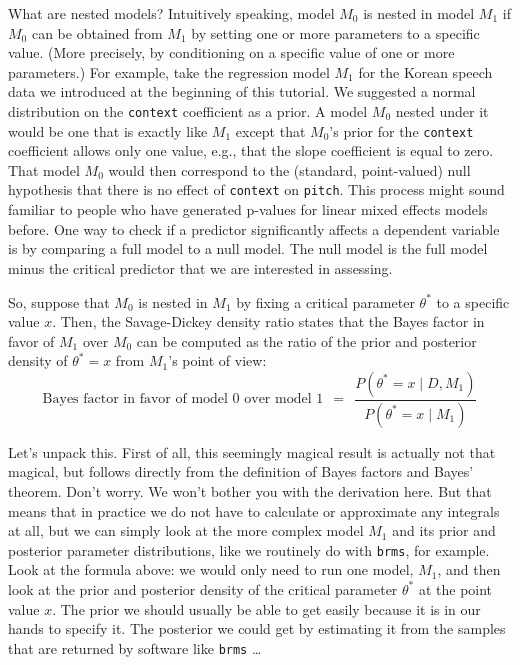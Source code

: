 \documentclass[
  doc,
  floatsintext,
  longtable,
  nolmodern,
  notxfonts,
  notimes,
  colorlinks=true,linkcolor=blue,citecolor=blue,urlcolor=blue]{apa7}
\begin{document}
What are nested models? Intuitively speaking, model \(M_0\) is nested in
model \(M_1\) if \(M_0\) can be obtained from \(M_1\) by setting one or
more parameters to a specific value. (More precisely, by conditioning on
a specific value of one or more parameters.) For example, take the
regression model \(M_1\) for the Korean speech data we introduced at the
beginning of this tutorial. We suggested a normal distribution on the
\texttt{context} coefficient as a prior. A model \(M_0\) nested under it
would be one that is exactly like \(M_1\) except that \(M_0\)'s prior
for the \texttt{context} coefficient allows only one value, e.g., that
the slope coefficient is equal to zero. That model \(M_0\) would then
correspond to the (standard, point-valued) null hypothesis that there is
no effect of \texttt{context} on \texttt{pitch}. This process might
sound familiar to people who have generated p-values for linear mixed
effects models before. One way to check if a predictor significantly
affects a dependent variable is by comparing a full model to a null
model. The null model is the full model minus the critical predictor
that we are interested in assessing.

So, suppose that \(M_0\) is nested in \(M_1\) by fixing a critical
parameter \(\theta^*\) to a specific value \(x\). Then, the
Savage-Dickey density ratio states that the Bayes factor in favor of
\(M_1\) over \(M_0\) can be computed as the ratio of the prior and
posterior density of \(\theta^*=x\) from \(M_1\)'s point of view: \[
\text{Bayes factor in favor of model 0 over model 1} \ \  = \ \  \frac{P(\theta^*=x \mid D, M_1)}{P(\theta^*=x \mid M_1)}
\]

Let's unpack this. First of all, this seemingly magical result is
actually not that magical, but follows directly from the definition of
Bayes factors and Bayes' theorem. Don't worry. We won't bother you with
the derivation here. But that means that in practice we do not have to
calculate or approximate any integrals at all, but we can simply look at
the more complex model \(M_1\) and its prior and posterior parameter
distributions, like we routinely do with \texttt{brms}, for example.
Look at the formula above: we would only need to run one model, \(M_1\),
and then look at the prior and posterior density of the critical
parameter \(\theta^*\) at the point value \(x\). The prior we should
usually be able to get easily because it is in our hands to specify it.
The posterior we could get by estimating it from the samples that are
returned by software like \texttt{brms} \ldots{}
\end{document}
